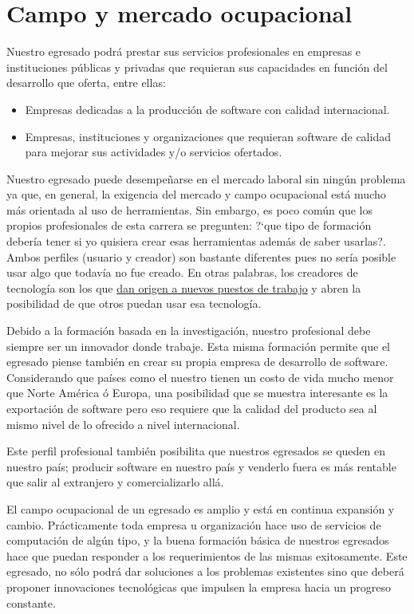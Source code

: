 \section{Campo y mercado ocupacional}\label{sec:campo-ocupacional}
Nuestro egresado podrá prestar sus servicios profesionales en empresas e instituciones públicas y privadas que requieran sus capacidades en función del desarrollo que oferta, entre ellas:

\begin{itemize}
\item Empresas dedicadas a la producción de software con calidad internacional.
\item Empresas, instituciones y organizaciones que requieran software de calidad para mejorar sus actividades y/o servicios ofertados.
\end{itemize}

Nuestro egresado puede desempeñarse en el mercado laboral sin ningún problema ya que, en general, la exigencia del mercado y campo ocupacional está mucho más orientada al uso de herramientas. Sin embargo, es poco común que los propios profesionales de esta carrera se pregunten: ?`que tipo de formación debería tener si yo quisiera crear esas herramientas además de saber usarlas?. Ambos perfiles (usuario y creador) son bastante diferentes pues no sería posible usar algo que todavía no fue creado. En otras palabras, los creadores de tecnología son los que \underline{dan origen a nuevos puestos de trabajo} y abren la posibilidad de que otros puedan usar esa tecnología.

Debido a la formación basada en la investigación, nuestro profesional debe siempre ser un innovador donde trabaje. Esta misma formación permite que el egresado piense también en crear su propia empresa de desarrollo de software. Considerando que países como el nuestro tienen un costo de vida mucho menor que Norte América ó Europa, una posibilidad que se muestra interesante es la exportación de software pero eso requiere que la calidad del producto sea al mismo nivel de lo ofrecido a nivel internacional.

Este perfil profesional también posibilita que nuestros egresados se queden en nuestro país; producir software en nuestro país y venderlo fuera es más rentable que salir al extranjero y comercializarlo allá.

El campo ocupacional de un egresado es amplio y está en continua expansión y cambio. Prácticamente toda empresa u organización hace uso de servicios de computación de algún tipo, y la buena formación básica de nuestros egresados hace que puedan responder a los requerimientos de las mismas exitosamente. Este egresado, no sólo podrá dar soluciones a los problemas existentes sino que deberá proponer innovaciones tecnológicas que impulsen la empresa hacia un progreso constante.

